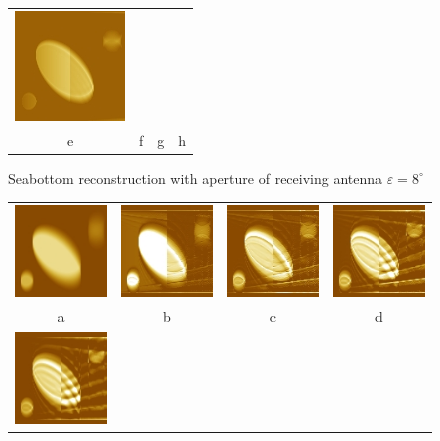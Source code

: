 \documentclass{procDDs}
\begin{document}
\begin{figure}[h!]
\begin{tabular}{cccc}
		\includegraphics[width=0.2\linewidth]{img/9/9.jpg}\\
		e & f & g & h
	\end{tabular}
	\caption{Seabottom reconstruction with aperture of receiving antenna $\varepsilon=8^\circ$}
	\label{ris:desc4}
\end{figure}
\begin{figure}[h!]\center%
	\begin{tabular}{cccc}
		\includegraphics[width=0.2\linewidth]{img/13/1.jpg}&
		\includegraphics[width=0.2\linewidth]{img/13/3.jpg}&
		\includegraphics[width=0.2\linewidth]{img/13/4.jpg}&
		\includegraphics[width=0.2\linewidth]{img/13/5.jpg}\\
		a & b & c & d\\
		\includegraphics[width=0.2\linewidth]{img/13/6.jpg}&

\end{tabular}
\end{figure}
\end{document}
